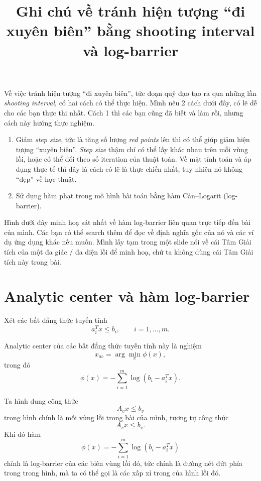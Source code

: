 \documentclass[12pt,a4paper]{article}
\title{Ghi chú về tránh hiện tượng ``đi xuyên biên'' bằng shooting interval và log-barrier}
\author{}
\date{}
\begin{document}
\maketitle

Về việc tránh hiện tượng ``đi xuyên biên'', tức đoạn quỹ đạo tạo ra qua những lần \textit{shooting interval}, có hai cách có thể thực hiện. Mình nêu 2 cách dưới đây, có lẽ dễ cho các bạn thực thi nhất. Cách 1 thì các bạn cũng đã biết và làm rồi, nhưng cách này hướng thực nghiệm.

\begin{enumerate}
    \item Giảm \textit{step size}, tức là tăng số lượng \textit{red points} lên thì có thể giúp giảm hiện tượng ``xuyên biên''. \textit{Step size} thậm chí có thể lấy khác nhau trên mỗi vùng lồi, hoặc có thể đổi theo số iteration của thuật toán. Về mặt tính toán và áp dụng thực tế thì đây là cách có lẽ là thực chiến nhất, tuy nhiên nó không ``đẹp'' về học thuật.

    \item Sử dụng hàm phạt trong mô hình bài toán bằng hàm Cản--Logarit (log-barrier).
\end{enumerate}

Hình dưới đây minh hoạ sát nhất về hàm log-barrier liên quan trực tiếp đến bài của mình. Các bạn có thể search thêm để đọc về định nghĩa gốc của nó và các ví dụ ứng dụng khác nếu muốn. Mình lấy tạm trong một slide nói về cái Tâm Giải tích của một đa giác / đa diện lồi để minh hoạ, chứ ta không dùng cái Tâm Giải tích này trong bài.

\section*{Analytic center và hàm log-barrier}

Xét các bất đẳng thức tuyến tính
\[
    a_i^T x \leq b_i, \qquad i = 1,\ldots,m.
\]

Analytic center của các bất đẳng thức tuyến tính này là nghiệm
\[
    x_{ac} = \arg\min_x \phi(x),
\]
trong đó
\[
    \phi(x) = - \sum_{i=1}^{m} \log\left(b_i - a_i^T x\right).
\]

Ta hình dung công thức
\[
    A_v x \leq b_v
\]
trong hình chính là mỗi vùng lồi trong bài của mình, tương tự công thức
\[
    A_v x \leq b_v.
\]
Khi đó hàm
\[
    \phi(x) = - \sum_{i=1}^{m} \log\left(b_i - a_i^T x\right)
\]
chính là log-barrier của các biên vùng lồi đó, tức chính là đường nét đứt phía trong trong hình, mà ta có thể gọi là các xấp xỉ trong của hình lồi đó.
\end{document}
